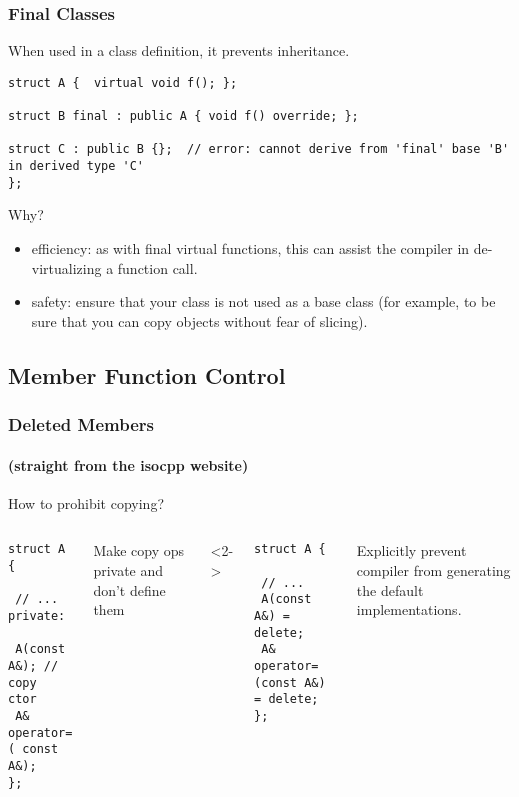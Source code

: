 

\begin{frame}[fragile]
\frametitle{Final Classes}
When used in a class definition, it prevents inheritance.
{\scriptsize
\begin{verbatim}
struct A {  virtual void f(); };

struct B final : public A { void f() override; };

struct C : public B {};  // error: cannot derive from 'final' base 'B' in derived type 'C'
};
\end{verbatim}
}
Why?
\begin{itemize}
\item efficiency: as with final virtual functions, this can assist the
  compiler in de-virtualizing a function call.
\item safety: ensure that your class is not used as a base class (for
  example, to be sure that you can copy objects without fear of
  slicing).
\end{itemize}

    
\end{frame}


\subsection{Member Function Control}

\begin{frame}[fragile]
\frametitle{Deleted Members}
\framesubtitle{(straight from the isocpp website)}
How to prohibit copying?
\vskip 12pt
\begin{columns}[t]
{\scriptsize

\begin{verbatim}
struct A {

 // ...
private:

 A(const A&); // copy ctor
 A& operator=( const A&);
};
\end{verbatim}

Make copy ops private and don't define them
}
<2->
{\scriptsize
\begin{verbatim}
struct A {

 // ...
 A(const A&) = delete;
 A& operator=(const A&) = delete;
};
\end{verbatim}

Explicitly prevent compiler from generating the default implementations.
}
\end{columns}

\end{frame}


